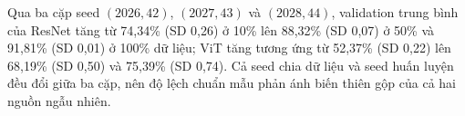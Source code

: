 Qua ba cặp seed $(2026,42)$, $(2027,43)$ và $(2028,44)$, validation trung bình của ResNet tăng từ 74,34\% (SD 0,26) ở 10\% lên 88,32\% (SD 0,07) ở 50\% và 91,81\% (SD 0,01) ở 100\% dữ liệu; ViT tăng tương ứng từ 52,37\% (SD 0,22) lên 68,19\% (SD 0,50) và 75,39\% (SD 0,74). Cả seed chia dữ liệu và seed huấn luyện đều đổi giữa ba cặp, nên độ lệch chuẩn mẫu phản ánh biến thiên gộp của cả hai nguồn ngẫu nhiên.
